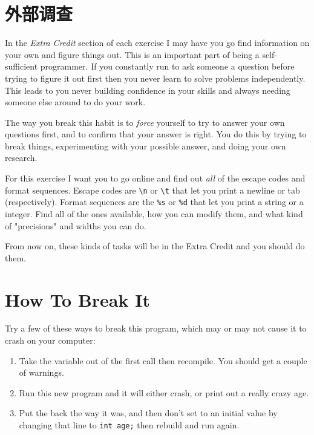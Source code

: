 \section{外部调查}

In the \emph{Extra Credit} section of each exercise I may have you go
find information on your own and figure things out.  This is an important
part of being a self-sufficient programmer.  If you constantly run to
ask someone a question before trying to figure it out first then you
never learn to solve problems independently.  This leads to you never
building confidence in your skills and always needing someone else
around to do your work.

The way you break this habit is to \emph{force} yourself to try to answer
your own questions first, and to confirm that your answer is right.  You
do this by trying to break things, experimenting with your possible answer,
and doing your own research.

For this exercise I want you to go online and find out \emph{all} of the
 escape codes and format sequences.  Escape codes are 
\verb|\n| or \verb|\t| that let you print a newline or tab (respectively).
Format sequences are the \verb|%s| or \verb|%d| that let you print a 
string or a integer.  Find all of the ones available, how you can
modify them, and what kind of "precisions" and widths you can do.

From now on, these kinds of tasks will be in the Extra Credit and you
should do them.

\section{How To Break It}

Try a few of these ways to break this program, which may or may
not cause it to crash on your computer:

\begin{enumerate}
\item Take the  variable out of the first  call
    then recompile. You should get a couple of warnings.
\item Run this new program and it will either crash, or print out a really
    crazy age.
\item Put the  back the way it was, and then don't set 
    to an initial value by changing that line to \verb|int age;| then
    rebuild and run again.
\end{enumerate}


